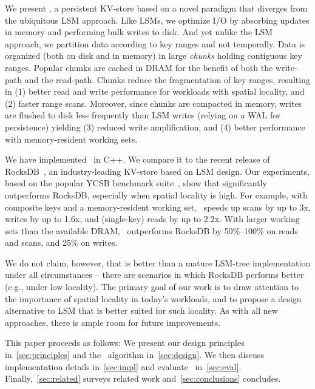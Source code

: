 We present \sys, a persistent KV-store based on a novel paradigm that diverges from the ubiquitous LSM approach.  
Like  LSMs,  we optimize I/O by absorbing updates in memory and performing bulk writes to disk. 
And yet unlike the LSM approach, we partition data according to key ranges and not temporally.
Data is  organized (both on disk and in memory) in large \emph{chunks} holding contiguous key ranges.
Popular chunks are cached in DRAM for the benefit of  both the write-path and the read-path.
Chunks reduce the fragmentation of key ranges, resulting in 
(1) better read and write performance for workloads with spatial locality,  and
(2) faster range scans. 
Moreover, since chunks  are compacted in memory, writes are 
flushed to disk less frequently than LSM writes (relying on a WAL for persistence)
yielding 
(3) reduced write amplification, and 
(4) better performance with memory-resident working sets.
 
We have implemented \sys\ in C++. We compare it to the recent release of RocksDB~\cite{rocks}, 
an industry-leading KV-store  based on LSM design. Our experiments, based on the popular 
YCSB benchmark suite~\cite{YCSB}, show that \sys\/ significantly outperforms  RocksDB, 
especially when spatial  locality is high. 
For example, with composite keys and a memory-resident working set, \sys\  speeds up scans 
by up to 3x, writes by up to 1.6x, and (single-key) reads by up to 2.2x.
With larger working sets than the available DRAM, \sys\ outperforms RocksDB by 50\%--100\% on reads  and 
scans, and 25\% on writes. 

We do not claim, however, that \sys\/ is better than a mature LSM-tree implementation
under all circumstances -- there are scenarios in which RocksDB performs better (e.g., under low locality). 
The primary goal of our work is to draw attention to the importance of spatial locality in 
today's workloads, and to propose a design alternative to LSM that is better suited for such locality. 
As with all new approaches, there is ample  room for 
future improvements. 
 
 This paper proceeds as follows:
We present our design principles in~\cref{sec:principles} and  the \sys\ algorithm 
in~\cref{sec:design}. We then discuss implementation details in~\cref{sec:impl} and evaluate 
\sys\ in~\cref{sec:eval}.  Finally,~\cref{sec:related}   surveys related work and~\cref{sec:conclusions}
concludes. 


